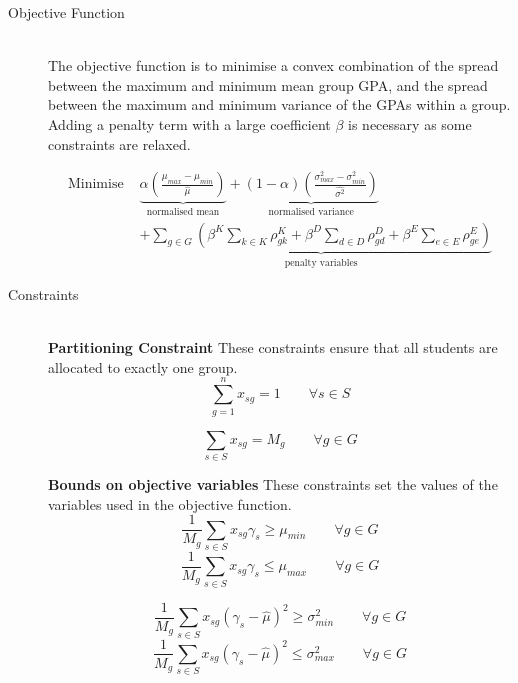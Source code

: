 \documentclass[12pt]{ORSNZ}
\begin{document}
\begin{description}
\item[Objective Function]\mbox{} \\
The objective function is to minimise a convex combination of the spread between the maximum and minimum mean group GPA, and the spread between the maximum and minimum variance of the GPAs within a group. Adding a penalty term with a large coefficient $\beta$ is necessary as some constraints are relaxed.

\begin{equation}\begin{split}
\mbox{Minimise }&
\underbrace{\alpha\left(\frac{\mu_{max} - \mu_{min}}{\hat{\mu}}\right)}_{\mbox{normalised mean}} 
+ \underbrace{(1-\alpha)\left(\frac{\sigma^2_{max} - \sigma^2_{min}}{\hat{\sigma^2}}\right)}_{\mbox{normalised variance}}
\\&+ \underbrace{\sum_{g \in G}\left(\beta^K\sum_{k \in K}\rho^K_{gk} 
    + \beta^D\sum_{d \in D}\rho^D_{gd} 
    + \beta^E\sum_{e \in E}\rho^E_{ge}\right)}_{\mbox{penalty variables}}
\end{split}\end{equation}

\item[Constraints]\mbox{} \\
\textbf{Partitioning Constraint} These constraints ensure that all students are allocated to exactly one group.
\begin{equation} \label{con1}
\sum_{g=1}^n x_{sg} =  1 \qquad \mbox{$\forall s \in S$}
\end{equation}

\begin{equation} \label{con2}
\sum_{s \in S} x_{sg} =  M_g \qquad \mbox{$\forall g \in G$}
\end{equation}

\textbf{Bounds on objective variables} These constraints set the values of the variables used in the objective function.
\begin{equation} \label{minu}
\frac{1}{M_g}\sum_{s \in S} x_{sg}\gamma_s \geq \mu_{min} \qquad \mbox{$\forall g \in G$}
\end{equation}
\begin{equation} \label{maxu}
\frac{1}{M_g}\sum_{s \in S} x_{sg}  \gamma_s \leq \mu_{max} \qquad \mbox{$\forall g \in G$}
\end{equation}

\begin{equation} \label{minv}
\frac{1}{M_g}\sum_{s \in S} x_{sg} (\gamma_s  - \hat{\mu})^2 \geq \sigma^2_{min} \qquad\mbox{$\forall g \in G$}
\end{equation}
\begin{equation} \label{maxv}
\frac{1}{M_g}\sum_{s \in S} x_{sg}(\gamma_s - \hat{\mu})^2 \leq \sigma^2_{max} \qquad\mbox{$\forall g \in G$}
\end{equation}



\end{description}
\end{document}
